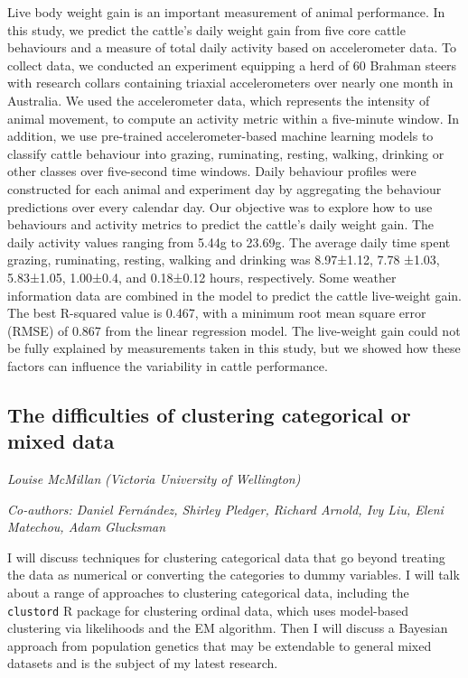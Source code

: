\documentclass[
]{scrreprt}
\begin{document}
Live body weight gain is an important measurement of animal performance.
In this study, we predict the cattle's daily weight gain from five core
cattle behaviours and a measure of total daily activity based on
accelerometer data. To collect data, we conducted an experiment
equipping a herd of 60 Brahman steers with research collars containing
triaxial accelerometers over nearly one month in Australia. We used the
accelerometer data, which represents the intensity of animal movement,
to compute an activity metric within a five-minute window. In addition,
we use pre-trained accelerometer-based machine learning models to
classify cattle behaviour into grazing, ruminating, resting, walking,
drinking or other classes over five-second time windows. Daily behaviour
profiles were constructed for each animal and experiment day by
aggregating the behaviour predictions over every calendar day. Our
objective was to explore how to use behaviours and activity metrics to
predict the cattle's daily weight gain. The daily activity values
ranging from 5.44g to 23.69g. The average daily time spent grazing,
ruminating, resting, walking and drinking was 8.97±1.12, 7.78 ±1.03,
5.83±1.05, 1.00±0.4, and 0.18±0.12 hours, respectively. Some weather
information data are combined in the model to predict the cattle
live-weight gain. The best R-squared value is 0.467, with a minimum root
mean square error (RMSE) of 0.867 from the linear regression model. The
live-weight gain could not be fully explained by measurements taken in
this study, but we showed how these factors can influence the
variability in cattle performance.

\subsection{The difficulties of clustering categorical or mixed
data}\label{the-difficulties-of-clustering-categorical-or-mixed-data}

\emph{Louise McMillan} \emph{(Victoria
University of Wellington)}

\emph{Co-authors: Daniel Fernández, Shirley Pledger, Richard Arnold, Ivy
Liu, Eleni Matechou, Adam Glucksman}

\setlength{\parskip}{0.5em}

I will discuss techniques for clustering categorical data that go beyond
treating the data as numerical or converting the categories to dummy
variables. I will talk about a range of approaches to clustering
categorical data, including the \texttt{clustord} R package for
clustering ordinal data, which uses model-based clustering via
likelihoods and the EM algorithm. Then I will discuss a Bayesian
approach from population genetics that may be extendable to general
mixed datasets and is the subject of my latest research.
\end{document}
